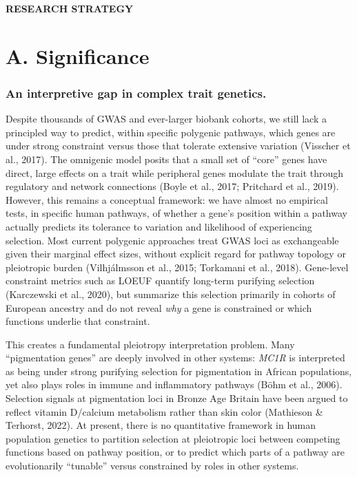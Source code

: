 \documentclass[11pt]{article}
\begin{document}
\begin{center}
{\Large \textbf{RESEARCH STRATEGY}}
\end{center}

\section{A. Significance}

\subsubsection{An interpretive gap in complex trait genetics.}
Despite thousands of GWAS and ever-larger biobank cohorts, we still lack a principled way to predict, within specific polygenic pathways, which genes are under strong constraint versus those that tolerate extensive variation (Visscher et al., 2017). The omnigenic model posits that a small set of ``core'' genes have direct, large effects on a trait while peripheral genes modulate the trait through regulatory and network connections (Boyle et al., 2017; Pritchard et al., 2019). However, this remains a conceptual framework: we have almost no empirical tests, in specific human pathways, of whether a gene's position within a pathway actually predicts its tolerance to variation and likelihood of experiencing selection. Most current polygenic approaches treat GWAS loci as exchangeable given their marginal effect sizes, without explicit regard for pathway topology or pleiotropic burden (Vilhj\'{a}lmsson et al., 2015; Torkamani et al., 2018). Gene-level constraint metrics such as LOEUF quantify long-term purifying selection (Karczewski et al., 2020), but summarize this selection primarily in cohorts of European ancestry and do not reveal \emph{why} a gene is constrained or which functions underlie that constraint.

This creates a fundamental pleiotropy interpretation problem. Many ``pigmentation genes'' are deeply involved in other systems: \emph{MC1R} is interpreted as being under strong purifying selection for pigmentation in African populations, yet also plays roles in immune and inflammatory pathways (B\"{o}hm et al., 2006). Selection signals at pigmentation loci in Bronze Age Britain have been argued to reflect vitamin D/calcium metabolism rather than skin color (Mathieson \& Terhorst, 2022). At present, there is no quantitative framework in human population genetics to partition selection at pleiotropic loci between competing functions based on pathway position, or to predict which parts of a pathway are evolutionarily ``tunable'' versus constrained by roles in other systems.
\end{document}
